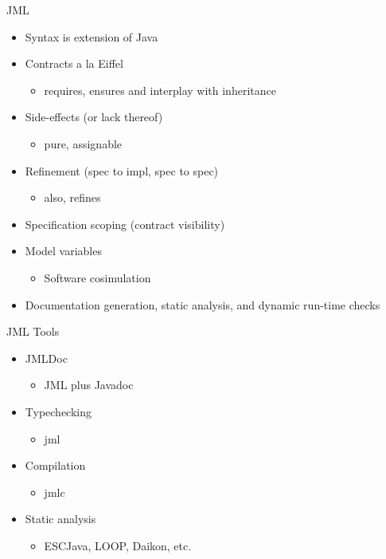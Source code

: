 \documentclass[%
final,
slideColor,
nototal,
nocolorBG,
pdf,
accumulate,
next,
]{prosper}
\begin{document}
\begin{slide}{JML}
  \begin{itemize}
  \item Syntax is extension of Java
  \item Contracts a la Eiffel
    \begin{itemize}
    \item requires, ensures and interplay with inheritance
    \end{itemize}
  \item Side-effects (or lack thereof)
    \begin{itemize}
    \item pure, assignable
    \end{itemize}
  \item Refinement (spec to impl, spec to spec)
    \begin{itemize}
    \item also, refines
    \end{itemize}
  \item Specification scoping (contract visibility)
  \item Model variables
    \begin{itemize}
    \item Software cosimulation
    \end{itemize}
  \item Documentation generation, static analysis, and dynamic run-time checks
  \end{itemize}
\end{slide}

\begin{slide}{JML Tools}
  \begin{itemize}
  \item JMLDoc
    \begin{itemize}
    \item JML plus Javadoc
    \end{itemize}
  \item Typechecking
    \begin{itemize}
    \item jml
    \end{itemize}
  \item Compilation
    \begin{itemize}
    \item jmlc
    \end{itemize}
  \item Static analysis
    \begin{itemize}
    \item ESCJava, LOOP, Daikon, etc.
    \end{itemize}
  \end{itemize}
\end{slide}
\end{document}
